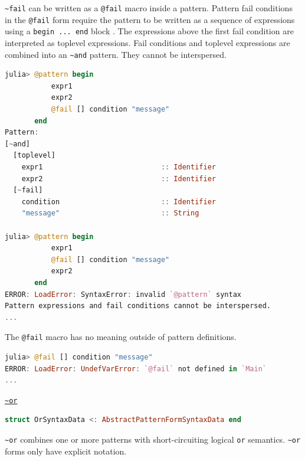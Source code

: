 \documentclass{juliacon}
\begin{document}
\texttt{\textasciitilde{}fail} can be written as a \texttt{@fail} macro inside a pattern. Pattern
fail conditions in the \texttt{@fail} form require the pattern to be written
as a sequence of expressions using a \texttt{begin ... end} block
\cite{compound_exprs}. The expressions above the first fail condition
are interpreted as toplevel expressions. Fail conditions and toplevel
expressions are combined into an \texttt{\textasciitilde{}and} pattern. They cannot be
interspersed.

\begin{lstlisting}[language=Julia]
julia> @pattern begin
           expr1
           expr2
           @fail [] condition "message"
       end
Pattern:
[~and]
  [toplevel]
    expr1                            :: Identifier
    expr2                            :: Identifier
  [~fail]
    condition                        :: Identifier
    "message"                        :: String

julia> @pattern begin
           expr1
           @fail [] condition "message"
           expr2
       end
ERROR: LoadError: SyntaxError: invalid `@pattern` syntax
Pattern expressions and fail conditions cannot be interspersed.
...
\end{lstlisting}

The \texttt{@fail} macro has no meaning outside of pattern definitions.

\begin{lstlisting}[language=Julia]
julia> @fail [] condition "message"
ERROR: LoadError: UndefVarError: `@fail` not defined in `Main`
...
\end{lstlisting}

\vspace{0.9cm}
\label{orgc8372d0}\vspace{0.2cm}
\underline{\texttt{\textasciitilde{}or}}

\begin{lstlisting}[language=Julia]
struct OrSyntaxData <: AbstractPatternFormSyntaxData end
\end{lstlisting}

\texttt{\textasciitilde{}or} combines one or more patterns with short-circuiting logical \texttt{or}
semantics. \texttt{\textasciitilde{}or} forms only have explicit notation.
\end{document}
